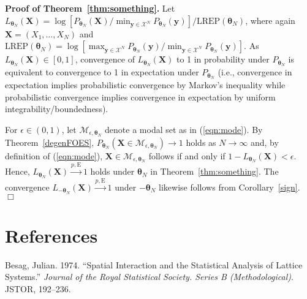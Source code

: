 \documentclass[12pt]{article}
\newcommand{\blue}[1]{{\color{blue} #1}}
\theoremstyle{definition}
\newcommand{\REP}{\mathrm{LREP}}
\begin{document}
\blue{

\noindent\textbf{Proof of Theorem~\ref{thm:something}.}  Let $L_{\boldsymbol \theta_{N}}(\boldsymbol X) = \log[ P_{\boldsymbol \theta_{N}}(\boldsymbol X)/ \min_{\boldsymbol y \in \mathcal{X}^N} P_{\boldsymbol \theta_{N}}(\boldsymbol y) ]/\REP(\boldsymbol \theta_{N})$, where again    $\boldsymbol X=(X_1, \dots, X_N)$ and $\REP(\boldsymbol \theta_{N})= \log[\max_{\boldsymbol y \in \mathcal{X}^N} P_{\boldsymbol \theta_{N}}(\boldsymbol y)/ \min_{\boldsymbol y \in \mathcal{X}^N} P_{\boldsymbol \theta_{N}}(\boldsymbol y) ]$.
As $L_{\boldsymbol \theta_{N}}(\boldsymbol X)\in[0,1]$, convergence of   $L_{\boldsymbol \theta_{N}}(\boldsymbol X)$ to 1 in probability
under $P_{\boldsymbol \theta_{N}}$ is equivalent to convergence to 1
  in expectation under $P_{\boldsymbol \theta_{N}}$ (i.e., convergence in expectation implies probabilistic convergence by Markov's inequality while probabilistic convergence implies  convergence in expectation by uniform integrability/boundedness).

  For $\epsilon \in(0,1)$, let $\mathcal{M}_{\epsilon, \boldsymbol \theta_N}$ denote a modal set as in (\ref{eqn:mode}).  By Theorem~\ref{degenFOES},
$P_{\boldsymbol \theta_N}\left( \boldsymbol X\in \mathcal{M}_{\epsilon, \boldsymbol \theta_N}\right) \rightarrow 1$ holds as $N \rightarrow \infty$ and, by definition of (\ref{eqn:mode}), $\boldsymbol X\in \mathcal{M}_{\epsilon, \boldsymbol \theta_N}$ follows if and only if
$1-L_{\boldsymbol \theta_{N}}(\boldsymbol X)<\epsilon$.  Hence, $L_{\boldsymbol \theta_{N}}(\boldsymbol X)
\stackrel{\mbox{$p,\mathrm{E}$}}{\longrightarrow} 1$ holds under $\boldsymbol \theta_{N} $ in Theorem~\ref{thm:something}.  The convergence
 $L_{-\boldsymbol \theta_{N}}(\boldsymbol X)
\stackrel{\mbox{$p,\mathrm{E}$}}{\longrightarrow} 1$  under $-\boldsymbol \theta_{N} $  likewise follows from Corollary~\ref{sign}. \hfill $\Box$

}

\clearpage
\section*{References}\label{references}

\hypertarget{refs}{}
\hypertarget{ref-besag1974spatial}{}
Besag, Julian. 1974. ``Spatial Interaction and the Statistical Analysis
of Lattice Systems.'' \emph{Journal of the Royal Statistical Society.
Series B (Methodological)}. JSTOR, 192--236.
\end{document}
